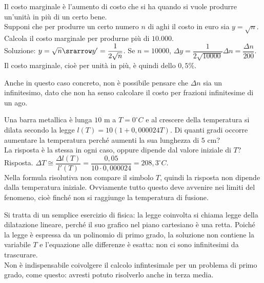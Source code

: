 \begin{esempio}
Il costo marginale è l'aumento di costo che si ha quando si vuole produrre 
un'unità in più di un certo bene.\\
Supponi che per produrre un certo numero $n$ di aghi il costo in euro sia
$y=\sqrt{n}$. Calcola il costo marginale per produrne più di $10.000$.\\
Soluzione: $y=\sqrt{n}\srarrow y'=\dfrac{1}{2\sqrt{n}}$.
Se $n=10000$, $\Delta y=\dfrac{1}{2\sqrt{10000}}\Delta n=\dfrac{\Delta n}{200}$.
Il costo marginale, cioè per unità in più, è quindi dello $0,5\%$.
\begin{osservazione}
 Anche in questo caso concreto, non è possibile pensare che $\Delta n$ sia un
 infinitesimo, dato che non ha senso calcolare il costo per frazioni 
 infinitesime di un ago.
\end{osservazione}
\end{esempio}
 
\begin{esempio}
 Una barra metallica è lunga $10$ m a $T=0 ^\circ C$ e al crescere della 
 temperatura si dilata secondo la legge $l(T)=10(1+0,000024T)$. Di quanti gradi 
 occorre aumentare la temperatura perché aumenti la sua lunghezza di $5$ cm?\\
 La risposta è la stessa in ogni caso, oppure dipende dal valore iniziale di 
 $T$?\\
 Risposta. $\Delta T\cong \dfrac{\Delta l(T)}{l'(T)}=\dfrac{0,05}
 {10\cdot 0,000024}=208,3 ^\circ C$.\\
 Nella formula risolutiva non compare il simbolo $T$, quindi la risposta non 
 dipende dalla temperatura iniziale. Ovviamente tutto questo deve avvenire nei 
 limiti del fenomeno, cioè finché non si raggiunge la temperatura di fusione.
 \begin{osservazione}
  Si tratta di un semplice esercizio di fisica: la legge coinvolta si chiama
  legge della dilatazione lineare, perché il suo grafico nel piano cartesiano 
  è una retta. Poiché la legge è espressa da un polinomio di primo grado, la 
  soluzione non contiene la variabile $T$ e l'equazione alle differenze è
  esatta: non ci sono infinitesimi da trascurare.\\
  Non è indispensabile coivolgere il calcolo infintesimale per un problema di
  primo grado, come questo: avresti potuto risolverlo anche in terza media.
 \end{osservazione}

\end{esempio}

